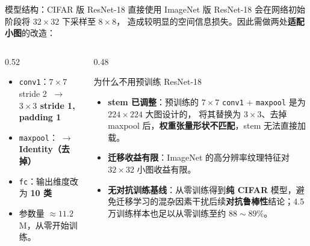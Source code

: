 \documentclass[aspectratio=169,11pt]{beamer}
\begin{document}
\begin{frame}{模型结构：CIFAR 版 ResNet-18}
  直接使用 ImageNet 版 ResNet-18 会在网络初始阶段将 $32\times32$ 下采样至 $8\times8$，
  造成较明显的空间信息损失。因此需做两处\textbf{适配小图}的改造：
  \begin{columns}[T]
    \begin{column}{0.52\textwidth}
      \begin{itemize}
        \item \texttt{conv1}：$7\times7$ stride 2 $\;\to\;$ \textbf{$3\times3$ stride 1, padding 1}
        \item \texttt{maxpool}：$\;\to\;$ \textbf{Identity（去掉）}
        \item \texttt{fc}：输出维度改为 \textbf{10 类}
      \end{itemize}
      \vspace{0.4em}
      \begin{itemize}
        \item 参数量 $\approx 11.2$\,M，从零开始训练。
      \end{itemize}
    \end{column}
    \begin{column}{0.48\textwidth}
      \begin{block}{为什么不用预训练 ResNet-18}
        \footnotesize
        \begin{itemize}
          \item \textbf{stem 已调整}：预训练的 $7\times7$ \texttt{conv1} + \texttt{maxpool} 是为 $224\times224$ 大图设计的，
                将其替换为 $3\times3$、去掉 maxpool 后，\textbf{权重张量形状不匹配}，stem 无法直接加载。
          \item \textbf{迁移收益有限}：ImageNet 的高分辨率纹理特征对 $32\times32$ 小图收益有限。
          \item \textbf{无对抗训练基线}：从零训练得到\textbf{纯 CIFAR} 模型，避免迁移学习的混杂因素干扰后续\textbf{对抗鲁棒性}结论；4.5 万训练样本也足以从零训练至约 $88\sim89\%$。
        \end{itemize}
      \end{block}
    \end{column}
  \end{columns}
\end{frame}
\end{document}
